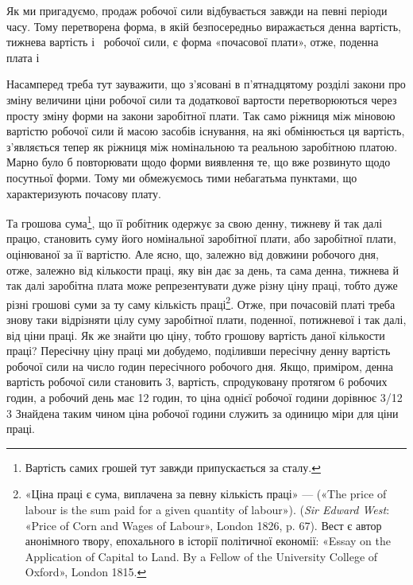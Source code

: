 Як ми пригадуємо, продаж робочої сили відбувається завжди
на певні періоди часу. Тому перетворена форма, в якій безпосередньо
виражається денна вартість, тижнева вартість і~ робочої
сили, є форма «почасової плати», отже, поденна плата і~

Насамперед треба тут зауважити, що з’ясовані в п’ятнадцятому
розділі закони про зміну величини ціни робочої сили та додаткової
вартости перетворюються через просту зміну форми
на закони заробітної плати. Так само ріжниця між міновою вартістю
робочої сили й масою засобів існування, на які обмінюється
ця вартість, з’являється тепер як ріжниця між номінальною та
реальною заробітною платою. Марно було б повторювати щодо
форми виявлення те, що вже розвинуто щодо посутньої форми.
Тому ми обмежуємось тими небагатьма пунктами, що характеризують
почасову плату.

Та грошова сума\footnote{
Вартість самих грошей тут завжди припускається за сталу.
}, що її робітник одержує за свою денну,
тижневу й так далі працю, становить суму його номінальної
заробітної плати, або заробітної плати, оцінюваної за її вартістю.
Але ясно, що, залежно від довжини робочого дня, отже,
залежно від кількости праці, яку він дає за день, та сама денна,
тижнева й так далі заробітна плата може репрезентувати дуже
різну ціну праці, тобто дуже різні грошові суми за ту саму кількість
праці\footnote{
«Ціна праці є сума, виплачена за певну кількість праці» — («The
price of labour is the sum paid for a given quantity of labour»).
(\emph{Sir Edward West}: «Price of Corn and Wages of Labour», London 1826,
p. 67). Вест є автор анонімного твору, епохального в історії політичної економії:
«Essay on the Application of Capital to Land. By a Fellow of the
University College of Oxford», London 1815.
}. Отже, при почасовій платі треба знову таки відрізняти
цілу суму заробітної плати, поденної, потижневої і так
далі, від ціни праці. Як же знайти цю ціну, тобто грошову вартість
даної кількости праці? Пересічну ціну праці ми добудемо,
поділивши пересічну денну вартість робочої сили на число годин
пересічного робочого дня. Якщо, приміром, денна вартість
робочої сили становить 3, вартість, спродуковану протягом
6 робочих годин, а робочий день має 12 годин, то ціна однієї
робочої години дорівнює 3/12 \deq{} 3 Знайдена
таким чином ціна робочої години служить за одиницю міри для
ціни праці.

